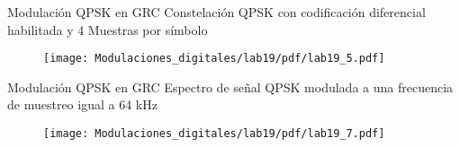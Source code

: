 \begin{frame}{Modulación QPSK en GRC}
\justifying
Constelación QPSK con codificación diferencial habilitada y 4 Muestras por símbolo
\begin{figure}
\texttt{[image: Modulaciones\_digitales/lab19/pdf/lab19\_5.pdf]}
\end{figure}
\end{frame}
\begin{frame}{Modulación QPSK en GRC}
Espectro de señal QPSK modulada a una frecuencia de muestreo igual a 64 kHz
\begin{figure}
\texttt{[image: Modulaciones\_digitales/lab19/pdf/lab19\_7.pdf]}
\end{figure}
\end{frame}
